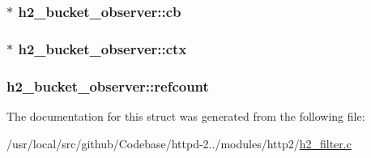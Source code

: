 \subsubsection[{\texorpdfstring{cb}{cb}}]{$\ast$ h2\+\_\+bucket\+\_\+observer\+::cb}\hypertarget{structh2__bucket__observer_aedce8ee49102d649447de558589a59dd}{}\label{structh2__bucket__observer_aedce8ee49102d649447de558589a59dd}
\subsubsection[{\texorpdfstring{ctx}{ctx}}]{$\ast$ h2\+\_\+bucket\+\_\+observer\+::ctx}\hypertarget{structh2__bucket__observer_a90ac92da0f21babd5805114aabdda2f9}{}\label{structh2__bucket__observer_a90ac92da0f21babd5805114aabdda2f9}
\subsubsection[{\texorpdfstring{refcount}{refcount}}]{ h2\+\_\+bucket\+\_\+observer\+::refcount}\hypertarget{structh2__bucket__observer_a2f1549ed2736fa362cacd711875fbc41}{}\label{structh2__bucket__observer_a2f1549ed2736fa362cacd711875fbc41}


The documentation for this struct was generated from the following file\+:\begin{DoxyCompactItemize}
\item 
/usr/local/src/github/\+Codebase/httpd-\/2../modules/http2/\hyperlink{h2__filter_8c}{h2\+\_\+filter.\+c}\end{DoxyCompactItemize}
